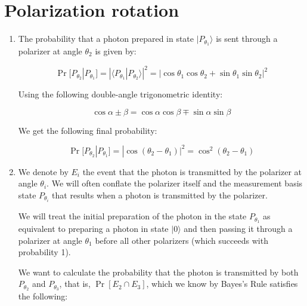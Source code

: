 \documentclass[12pt]{article}
\begin{document}
\newcommand{\ket}[1]{|#1 \rangle}
\newcommand{\bra}[1]{\langle #1 |}
\newcommand{\normtwo}{\frac{1}{\sqrt{2}}}

\setcounter{section}{0}
\section{Polarization rotation}

\begin{enumerate}

\item
The probability that a photon prepared in state $\ket{P_{\theta_1}}$ is sent
through a polarizer at angle $\theta_2$ is given by:

\begin{equation}
\Pr[P_{\theta_2} | P_{\theta_1} ] = | \langle P_{\theta_1} | P_{\theta_2} \rangle |^2 =
| \cos{\theta_1}\cos{\theta_2} + \sin{\theta_1}\sin{\theta_2} | ^2
\end{equation}

Using the following double-angle trigonometric identity:

\begin{equation}
\cos{\alpha \pm \beta} = \cos{\alpha}\cos{\beta} \mp \sin{\alpha}\sin{\beta}
\end{equation}

We get the following final probability:

\begin{equation}
\Pr[P_{\theta_2} | P_{\theta_1} ] = | \cos(\theta_2 - \theta_1) |^2 =
\cos^2(\theta_2 - \theta_1)
\end{equation}

\item

We denote by $E_i$ the event that the photon is transmitted by the polarizer
at angle $\theta_i$. We will often conflate the polarizer itself and the
measurement basis state $P_{\theta_i}$ that results when a photon is
transmitted by the polarizer.

We will treat the initial preparation of the photon in the state $P_{\theta_1}$
as equivalent to preparing a photon in state $\ket{0}$ and then passing
it through a polarizer at angle
$\theta_1$ before all other polarizers (which succeeds with probability 1).

We want to calculate the probability that the photon is transmitted by both
$P_{\theta_2}$ and $P_{\theta_3}$, that is, $\Pr[E_2 \cap E_3]$, which we know
by Bayes's Rule satisfies the following:


\end{enumerate}
\end{document}
